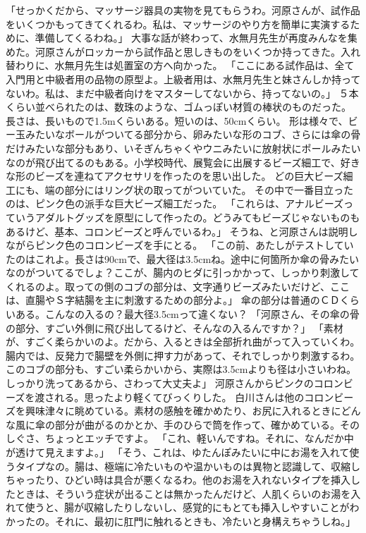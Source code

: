 「せっかくだから、マッサージ器具の実物を見てもらうわ。河原さんが、試作品をいくつかもってきてくれるわ。私は、マッサージのやり方を簡単に実演するために、準備してくるわね。」
大事な話が終わって、水無月先生が再度みんなを集めた。河原さんがロッカーから試作品と思しきものをいくつか持ってきた。入れ替わりに、水無月先生は処置室の方へ向かった。
「ここにある試作品は、全て入門用と中級者用の品物の原型よ。上級者用は、水無月先生と妹さんしか持ってないわ。私は、まだ中級者向けをマスターしてないから、持ってないの。」
５本くらい並べられたのは、数珠のような、ゴムっぽい材質の棒状のものだった。
長さは、長いもので1.5mくらいある。短いのは、50cmくらい。
形は様々で、ビー玉みたいなボールがついてる部分から、卵みたいな形のコブ、さらには傘の骨だけみたいな部分もあり、いそぎんちゃくやウニみたいに放射状にポールみたいなのが飛び出てるのもある。小学校時代、展覧会に出展するビーズ細工で、好きな形のビーズを連ねてアクセサリを作ったのを思い出した。
どの巨大ビーズ細工にも、端の部分にはリング状の取ってがついていた。
その中で一番目立ったのは、ピンク色の派手な巨大ビーズ細工だった。
「これらは、アナルビーズっていうアダルトグッズを原型にして作ったの。どうみてもビーズじゃないものもあるけど、基本、コロンビーズと呼んでいるわ。」
そうね、と河原さんは説明しながらピンク色のコロンビーズを手にとる。
「この前、あたしがテストしていたのはこれよ。長さは90cmで、最大径は3.5cmね。途中に何箇所か傘の骨みたいなのがついてるでしょ？ここが、腸内のヒダに引っかかって、しっかり刺激してくれるのよ。取っての側のコブの部分は、文字通りビーズみたいだけど、ここは、直腸やＳ字結腸を主に刺激するための部分よ。」
傘の部分は普通のＣＤくらいある。こんなの入るの？最大径3.5cmって違くない？
「河原さん、その傘の骨の部分、すごい外側に飛び出してるけど、そんなの入るんですか？」
「素材が、すごく柔らかいのよ。だから、入るときは全部折れ曲がって入っていくわ。腸内では、反発力で腸壁を外側に押す力があって、それでしっかり刺激するわ。このコブの部分も、すごい柔らかいから、実際は3.5cmよりも径は小さいわね。しっかり洗ってあるから、さわって大丈夫よ」
河原さんからピンクのコロンビーズを渡される。思ったより軽くてびっくりした。
白川さんは他のコロンビーズを興味津々に眺めている。素材の感触を確かめたり、お尻に入れるときにどんな風に傘の部分が曲がるのかとか、手のひらで筒を作って、確かめている。そのしぐさ、ちょっとエッチですよ。
「これ、軽いんですね。それに、なんだか中が透けて見えますよ。」
「そう、これは、ゆたんぽみたいに中にお湯を入れて使うタイプなの。腸は、極端に冷たいものや温かいものは異物と認識して、収縮しちゃったり、ひどい時は具合が悪くなるわ。他のお湯を入れないタイプを挿入したときは、そういう症状が出ることは無かったんだけど、人肌くらいのお湯を入れて使うと、腸が収縮したりしないし、感覚的にもとても挿入しやすいことがわかったの。それに、最初に肛門に触れるときも、冷たいと身構えちゃうしね。」
